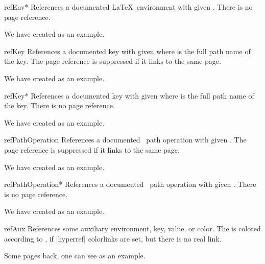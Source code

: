 \begin{docCommand}{refEnv*}{}
  References a documented \LaTeX\ environment with given .
  There is no page reference.
\begin{dispExample}
We have created  as an example.
\end{dispExample}
\end{docCommand}


\begin{docCommand}{refKey}{}
  References a documented key with given  where 
  is the full path name of the key.
  The page reference is suppressed if it links to the same page.
\begin{dispExample}
We have created  as an example.
\end{dispExample}
\end{docCommand}

\begin{docCommand}{refKey*}{}
  References a documented key with given  where 
  is the full path name of the key.
  There is no page reference.
\begin{dispExample}
We have created  as an example.
\end{dispExample}
\end{docCommand}

\clearpage

\begin{docCommand}[doc new=2019-09-17]{refPathOperation}{}
  References a documented \tikzname\ path operation with given .
  The page reference is suppressed if it links to the same page.
\begin{dispExample}
We have created  as an example.
\end{dispExample}
\end{docCommand}

\begin{docCommand}[doc new=2019-09-17]{refPathOperation*}{}
  References a documented \tikzname\ path operation with given .
  There is no page reference.
\begin{dispExample}
We have created  as an example.
\end{dispExample}
\end{docCommand}



\begin{docCommand}[doc updated=2020-02-11]{refAux}{}
  References some auxiliary environment, key, value, or color.
  The  is colored according to ,
  if |hyperref| colorlinks are set, but there is no real link.
\begin{dispExample}
Some pages back, one can see  as an example.
\end{dispExample}
\end{docCommand}

